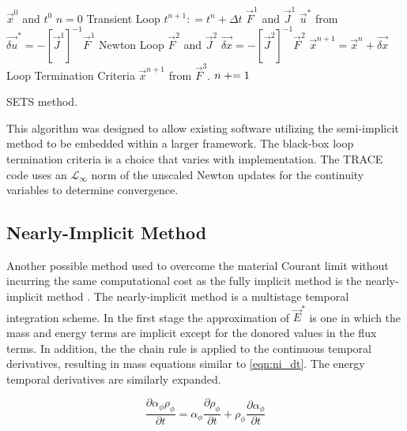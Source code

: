 \begin{algo}[ht!]
\setlength{\baselineskip}{0.625\baselineskip}
\begin{algorithmic}[1]
\Require $\vec{x}^{0}$ and $t^{0}$
\Set $n = 0$
\Loop \; Transient Loop
    \Set $t^{n+1} : = t^{n} + \Delta t$
	\Calculate $\vec{F}^{1}$ and $\vec{J}^{1}$
	\Calculate $\vec{u}^{*}$ from $\vec{\delta u}^{*} = -\left[\vec{J}^{1}\right]^{-1} \vec{F}^{1}$
	\Loop \; Newton Loop
		\Calculate $\vec{F}^{2}$ and $\vec{J}^{2}$
		\Calculate $\vec{\delta x} = - \left[\vec{J}^{2}\right]^{-1} \vec{F}^{2}$
		\Calculate $\vec{x}^{n+1} = \vec{x}^{n} + \vec{\delta x}$
		\BlackBox Loop Termination Criteria
	\EndLoop
	\Calculate $\vec{x}^{n+1}$ from $\vec{F}^{3}$.
	\Set $n \mathrel{+}= 1$
\EndLoop
\end{algorithmic}
\caption{SETS method.}
\label{alg:sets}
\end{algo}

This algorithm was designed to allow existing software utilizing the semi-implicit method to be embedded within a larger framework.
The black-box loop termination criteria is a choice that varies with implementation.
The TRACE code uses an $\mathcal{L}_{\infty}$ norm of the unscaled Newton updates for the continuity variables to determine convergence.

\subsection{Nearly-Implicit Method}
\label{subsect:numerics_nearly_implicit}
Another possible method used to overcome the material Courant limit without incurring the same computational cost as the fully implicit method is the nearly-implicit method \cite{Trapp1986, RELAP}.
The nearly-implicit method is a multistage temporal integration scheme.
In the first stage the approximation  of $\vec{E}^{*}$ is one in which the mass and energy terms are implicit except for the donored values in the flux terms. 
In addition, the the chain rule is applied to the continuous temporal derivatives, resulting in mass equations similar to \eqref{eqn:ni_dt}.
The energy temporal derivatives are similarly expanded.

\begin{equation}
\label{eqn:ni_dt}
\frac{\partial \alpha_{\phi} \rho_{\phi}}{\partial t} = \alpha_{\phi} \frac{\partial \rho_{\phi}}{\partial t} + \rho_{\phi} \frac{\partial \alpha_{\phi}}{\partial t}
\end{equation}

